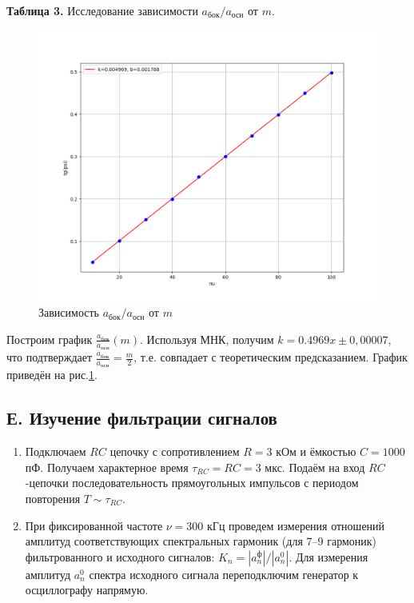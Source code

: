 \documentclass[a4paper,12pt]{article} %
\begin{document}
\begin{enumerate}
\begin{enumerate}
\begin{center}
\textbf{Таблица 3.} Исследование зависимости $a_{\text{бок}}/a_{\text{осн}}$ от $m$.
\end{center}
\begin{figure}[h]
    \centering
    \includegraphics[width=0.7\linewidth]{data/data2.png}
    \caption{Зависимость $a_{\text{бок}}/a_{\text{осн}}$ от $m$}
    \label{grafic3}
\end{figure}
Построим график $\frac{a_{\text{бок}}}{a_{\text{осн}}}(m)$. Используя МНК, получим $k=0.4969x\pm0,00007$, что подтверждает $\frac{a_{\text{бок}}}{a_{\text{осн}}}=\frac{m}{2}$, т.е. совпадает с теоретическим предсказанием. График приведён на рис.\ref{grafic3}.




\end{enumerate}








\newpage



\subsection*{Е. Изучение фильтрации сигналов}



\begin{enumerate}


\item [\textbf{1.}] Подключаем $RC$ цепочку с сопротивлением $R = 3$ кОм и ёмкостью $C = 1000$ пФ. Получаем характерное время $\tau_{RC} = RC = 3 $ мкс. Подаём на вход $RC$-цепочки последовательность прямоугольных импульсов с периодом повторения $T \sim \tau_{RC}$.



\item [\textbf{2.}] 
При фиксированной частоте $\nu = 300$ кГц проведем измерения отношений амплитуд соответствующих спектральных гармоник (для 7–9 гармоник) фильтрованного и исходного сигналов: $K_n = |a_n^\text{ф}|/|a_n^0|$. Для измерения 
амплитуд $a_n^0$ спектра исходного сигнала переподключим генератор к осциллографу напрямую.


\end{enumerate}
\end{enumerate}
\end{document}
